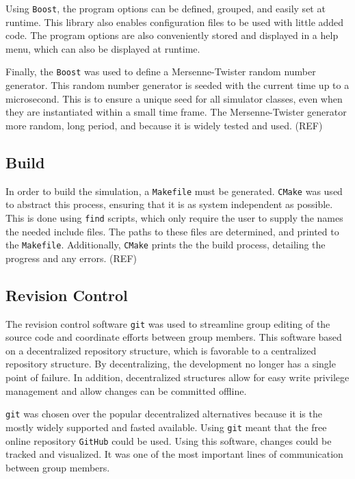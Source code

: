 \documentclass[a4paper,11pt]{article}
\begin{document}
Using \texttt{Boost}, the program options can be defined, grouped, and easily set at runtime.  This library also enables configuration files to be used with little added code.  The program options are also conveniently stored and displayed in a help menu, which can also be displayed at runtime.  

Finally, the \texttt{Boost} was used to define a Mersenne-Twister random number generator.  This random number generator is seeded with the current time up to a microsecond.  This is to ensure a unique seed for all simulator classes, even when they are instantiated within a small time frame.  The Mersenne-Twister generator more random, long period, and because it is widely tested and used.  (REF)

\subsection{Build}

In order to build the simulation, a \texttt{Makefile} must be generated.  \texttt{CMake} was used to abstract this process, ensuring that it is as system independent as possible.   This is done using \texttt{find} scripts, which only require the user to supply the names the needed include files.  The paths to these files are determined, and printed to the \texttt{Makefile}.  Additionally, \texttt{CMake} prints the the build process, detailing the progress and any errors. (REF) %

\subsection{Revision Control}

The revision control software \texttt{git} was used to streamline group editing of the source code and coordinate efforts between group members.  This software based on a decentralized repository structure, which is favorable to a centralized repository structure.  By decentralizing, the development no longer has a single point of failure.  In addition, decentralized structures allow for easy write privilege management and allow changes can be committed offline.

\texttt{git} was chosen over the popular decentralized alternatives because it is the mostly widely supported and fasted available.  Using \texttt{git} meant that the free online repository \texttt{GitHub} could be used.  Using this software, changes could be tracked and visualized.  It was one of the most important lines of communication between group members.
\end{document}
